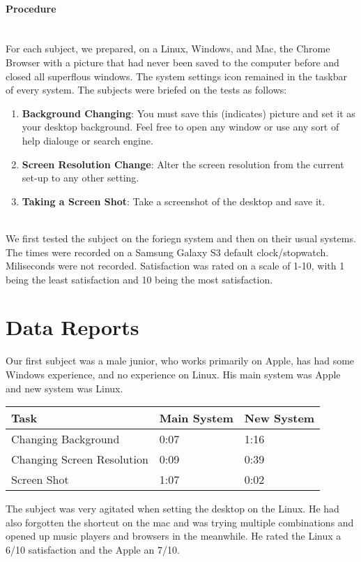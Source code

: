 \documentclass[12pt, onesided, letterpaper]{report}
\begin{document}
\paragraph*{Procedure} ~\\
For each subject, we prepared, on a Linux, Windows, and Mac, the Chrome Browser with a picture that had never been saved to the computer before and closed all superflous windows. The system settings icon remained in the taskbar of every system.  The subjects were briefed on the tests as follows:
\begin{enumerate}
\item \textbf{Background Changing}: You must save this (indicates) picture and set it as your desktop background.  Feel free to open any window or use any sort of help dialouge or search engine.
\item \textbf{Screen Resolution Change}: Alter the screen resolution from the current set-up to any other setting.
\item \textbf{Taking a Screen Shot}: Take a screenshot of the desktop and save it.
\end{enumerate}\\
We first tested the subject on the foriegn system and then on their usual systems. The times were recorded on a Samsung Galaxy S3 default clock/stopwatch.  Miliseconds were not recorded.  Satisfaction was rated on a scale of 1-10, with 1 being the least satisfaction and 10 being the most satisfaction.
\pagebreak

\section*{Data Reports}
Our first subject was a male junior, who works primarily on Apple, has had some Windows experience, and no experience on Linux. His main system was Apple and new system was Linux.
\begin{center}
    \begin{tabular}{ | l | l | l |}
    \hline
    Task &Main System & New System  \\ \hline
    Changing Background & 0:07 & 1:16  \\ \hline
    Changing Screen Resolution & 0:09 & 0:39  \\ \hline
    Screen Shot & 1:07 & 0:02 \\
    \hline
    \end{tabular}
\end{center}
The subject was very agitated when setting the desktop on the Linux.  He had also forgotten the shortcut on the mac and was trying multiple combinations and opened up music players and browsers in the meanwhile. 
He rated the Linux a 6/10 satisfaction and the Apple an 7/10.
\end{document}
